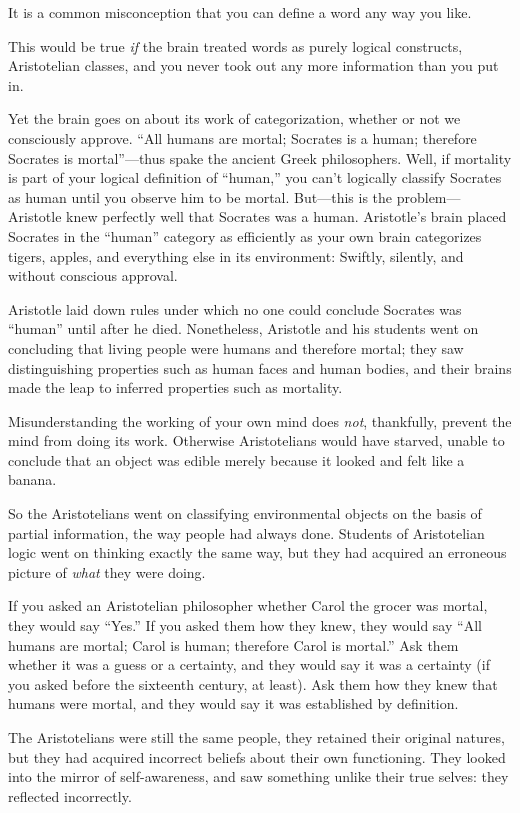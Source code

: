 {
 It is a common misconception that you can define a word any way
you like.}

{
 This would be true \textit{if} the brain treated words as purely
logical constructs, Aristotelian classes, and you never took out any
more information than you put in.}

{
 Yet the brain goes on about its work of categorization, whether or
not we consciously approve. ``All humans are mortal;
Socrates is a human; therefore Socrates is
mortal''---thus spake the ancient Greek philosophers.
Well, if mortality is part of your logical definition of
``human,'' you can't
logically classify Socrates as human until you observe him to be
mortal. But---this is the problem---Aristotle knew perfectly well that
Socrates was a human. Aristotle's brain placed Socrates
in the ``human'' category as
efficiently as your own brain categorizes tigers, apples, and
everything else in its environment: Swiftly, silently, and without
conscious approval.}

{
 Aristotle laid down rules under which no one could conclude
Socrates was ``human'' until after
he died. Nonetheless, Aristotle and his students went on concluding
that living people were humans and therefore mortal; they saw
distinguishing properties such as human faces and human bodies, and
their brains made the leap to inferred properties such as mortality.}

{
 Misunderstanding the working of your own mind does \textit{not},
thankfully, prevent the mind from doing its work. Otherwise
Aristotelians would have starved, unable to conclude that an object was
edible merely because it looked and felt like a banana.}

{
 So the Aristotelians went on classifying environmental objects on
the basis of partial information, the way people had always done.
Students of Aristotelian logic went on thinking exactly the same way,
but they had acquired an erroneous picture of \textit{what} they were
doing.}

{
 If you asked an Aristotelian philosopher whether Carol the grocer
was mortal, they would say ``Yes.''
If you asked them how they knew, they would say ``All
humans are mortal; Carol is human; therefore Carol is
mortal.'' Ask them whether it was a guess or a
certainty, and they would say it was a certainty (if you asked before
the sixteenth century, at least). Ask them how they knew that humans
were mortal, and they would say it was established by definition.}

{
 The Aristotelians were still the same people, they retained their
original natures, but they had acquired incorrect beliefs about their
own functioning. They looked into the mirror of self-awareness, and saw
something unlike their true selves: they reflected incorrectly.}

